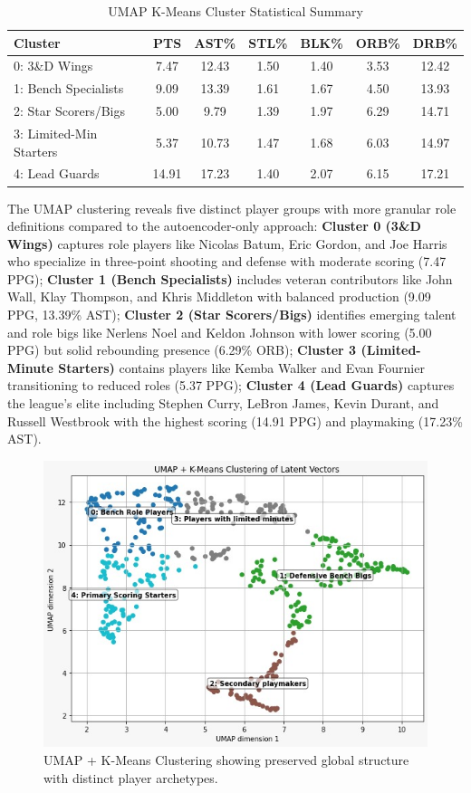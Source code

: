 \documentclass{article}
\begin{document}
\begin{table}[h!]
\centering
\caption{UMAP K-Means Cluster Statistical Summary}
\label{tab:umap_cluster_stats}
\begin{tabular}{lcccccc}
\toprule
\textbf{Cluster} & \textbf{PTS} & \textbf{AST\%} & \textbf{STL\%} & \textbf{BLK\%} & \textbf{ORB\%} & \textbf{DRB\%} \\
\midrule
0: 3\&D Wings & 7.47 & 12.43 & 1.50 & 1.40 & 3.53 & 12.42 \\
1: Bench Specialists & 9.09 & 13.39 & 1.61 & 1.67 & 4.50 & 13.93 \\
2: Star Scorers/Bigs & 5.00 & 9.79 & 1.39 & 1.97 & 6.29 & 14.71 \\
3: Limited-Min Starters & 5.37 & 10.73 & 1.47 & 1.68 & 6.03 & 14.97 \\
4: Lead Guards & 14.91 & 17.23 & 1.40 & 2.07 & 6.15 & 17.21 \\
\bottomrule
\end{tabular}
\end{table}

The UMAP clustering reveals five distinct player groups with more granular role definitions compared to the autoencoder-only approach: {\bf Cluster 0 (3\&D Wings)} captures role players like Nicolas Batum, Eric Gordon, and Joe Harris who specialize in three-point shooting and defense with moderate scoring (7.47 PPG); {\bf Cluster 1 (Bench Specialists)} includes veteran contributors like John Wall, Klay Thompson, and Khris Middleton with balanced production (9.09 PPG, 13.39\% AST); {\bf Cluster 2 (Star Scorers/Bigs)} identifies emerging talent and role bigs like Nerlens Noel and Keldon Johnson with lower scoring (5.00 PPG) but solid rebounding presence (6.29\% ORB); {\bf Cluster 3 (Limited-Minute Starters)} contains players like Kemba Walker and Evan Fournier transitioning to reduced roles (5.37 PPG); {\bf Cluster 4 (Lead Guards)} captures the league's elite including Stephen Curry, LeBron James, Kevin Durant, and Russell Westbrook with the highest scoring (14.91 PPG) and playmaking (17.23\% AST).

\begin{figure}[h]
    \centering
    \includegraphics[width=0.7\linewidth]{media/2d.jpeg}
    \caption{UMAP + K-Means Clustering showing preserved global structure with distinct player archetypes.}
    \label{fig:umap_clustering}
\end{figure}
\end{document}
